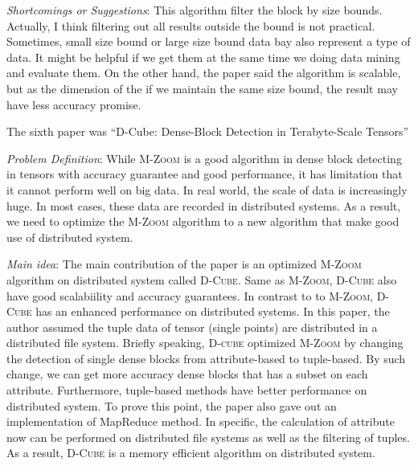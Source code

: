 \begin{itemize*}
\item {\em Shortcomings or Suggestions}:
      This algorithm filter the block by size bounds. Actually, I think filtering out all results outside the bound is not practical. Sometimes, small size bound or large size bound data bay also represent a type of data. It might be helpful if we get them at the same time we doing data mining and evaluate them. On the other hand, the paper said the algorithm is scalable, but as the dimension of the if we maintain the same size bound, the result may have less accuracy promise. 
      
    
      
\end{itemize*}
\newpage
The sixth paper was ``D-Cube: Dense-Block Detection in Terabyte-Scale Tensors''

\begin{itemize*}
\item {\em Problem Definition}: While \textsc{M-Zoom} is a good algorithm in dense block detecting in tensors with accuracy guarantee and good performance, it has limitation that it cannot perform well on big data. In real world, the scale of data is increasingly huge. In most cases, these data are recorded in distributed systems. As a result, we need to optimize the \textsc{M-Zoom} algorithm to a new algorithm that make good use of distributed system.  \\

\item {\em Main idea}: The main contribution of the paper is an optimized \textsc{M-Zoom} algorithm on distributed system called \textsc{D-Cube}. Same as \textsc{M-Zoom}, \textsc{D-Cube} also have good scalabiility and accuracy guarantees. In contrast to to \textsc{M-Zoom}, \textsc{D-Cube} has an enhanced performance on distributed systems. In this paper, the author assumed the tuple data of tensor (single points) are distributed in a distributed file system. Briefly speaking, \textsc{D-cube} optimized \textsc{M-Zoom} by changing the detection of single dense blocks from attribute-based to tuple-based. By such change, we can get more accuracy dense blocks that has a subset on each attribute. Furthermore, tuple-based methods have better performance on distributed system. To prove this point, the paper also gave out an implementation of MapReduce method. In specific, the calculation of attribute now can be performed on distributed file systems as well as the filtering of tuples. As a result, \textsc{D-Cube} is a memory efficient algorithm on distributed system. \\


\end{itemize*}
